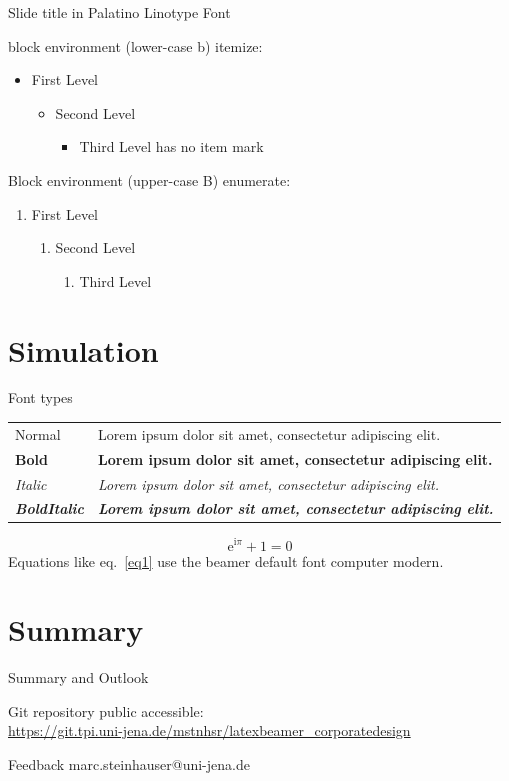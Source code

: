 \documentclass[10pt,aspectratio=43]{beamer}
\begin{document}
	
	\begin{frame}{Slide title in Palatino Linotype Font}
		\begin{block}{block environment (lower-case b)}
			itemize:
			\begin{itemize}
				\item First Level
				\begin{itemize}
					\item Second Level
					\begin{itemize}
						\item Third Level has no item mark
					\end{itemize}
				\end{itemize}
			\end{itemize}
		\end{block}
		\begin{Block}{Block environment (upper-case B)}
		enumerate:
		\begin{enumerate}
			\item First Level
			\begin{enumerate}
				\item Second Level
				\begin{enumerate}
					\item Third Level
				\end{enumerate}
			\end{enumerate}
		\end{enumerate}
		\end{Block}
	\end{frame}
	
	\section{Simulation}
	\begin{frame}{Font types}
		\begin{table}
			\begin{tabular}{ll}
				Normal & Lorem ipsum dolor sit amet, consectetur adipiscing elit.\\
				\textbf{Bold} & \textbf{Lorem ipsum dolor sit amet, consectetur adipiscing elit.}\\
				\textit{Italic} & \textit{Lorem ipsum dolor sit amet, consectetur adipiscing elit.}\\
				\textbf{\textit{BoldItalic}} & \textbf{\textit{Lorem ipsum dolor sit amet, consectetur adipiscing elit.}}
			\end{tabular}
		\end{table}
		\begin{equation}
			\textrm{e}^{\textrm{i}\pi}+1=0
			\label{eq1}
		\end{equation}
		Equations like eq.~\eqref{eq1} use the beamer default font computer modern.
	\end{frame}
	
	\section{Summary}
	\begin{frame}{Summary and Outlook}
		\begin{Block}{Git repository}
			public accessible:\\
			{\scriptsize\url{https://git.tpi.uni-jena.de/mstnhsr/latexbeamer_corporatedesign}}
		\end{Block}
		\begin{Block}{Feedback}
			marc.steinhauser@uni-jena.de
		\end{Block}
	\end{frame}
	
\end{document}

